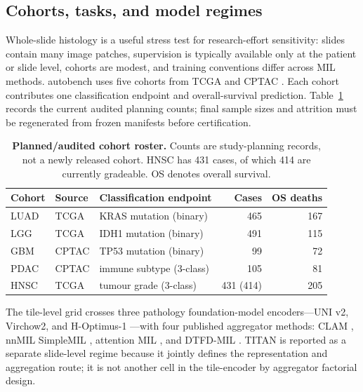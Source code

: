 \documentclass{article}
\newcommand{\autobench}{\textsf{autobench}\xspace}
\begin{document}
\subsection{Cohorts, tasks, and model regimes}

Whole-slide histology is a useful stress test for research-effort sensitivity:
slides contain many image patches, supervision is typically available only at
the patient or slide level, cohorts are modest, and training conventions differ
across MIL methods.  \autobench uses five cohorts from TCGA and CPTAC
\cite{tcga2013pancancer,wang2021gbm,cao2021pdac}.  Each cohort contributes one
classification endpoint and overall-survival prediction.  Table~\ref{tab:data}
records the current audited planning counts; final sample sizes and attrition
must be regenerated from frozen manifests before certification.

\begin{table}[t]
\centering
\caption{\textbf{Planned/audited cohort roster.}  Counts are study-planning
records, not a newly released cohort. HNSC has 431 cases, of which 414 are
currently gradeable. OS denotes overall survival.}
\label{tab:data}
\small
\setlength{\tabcolsep}{4.5pt}
\begin{tabularx}{\linewidth}{llXrr}
\toprule
Cohort & Source & Classification endpoint & Cases & OS deaths \\
\midrule
LUAD & TCGA & KRAS mutation (binary) & 465 & 167 \\
LGG & TCGA & IDH1 mutation (binary) & 491 & 115 \\
GBM & CPTAC & TP53 mutation (binary) & 99 & 72 \\
PDAC & CPTAC & immune subtype (3-class) & 105 & 81 \\
HNSC & TCGA & tumour grade (3-class) & 431 (414) & 205 \\
\bottomrule
\end{tabularx}
\end{table}

The tile-level grid crosses three pathology foundation-model encoders---UNI
v2, Virchow2, and H-Optimus-1
\cite{xu2024uni,vorontsov2024virchow,saillard2024hoptimus}---with four
published aggregator methods: CLAM \cite{lu2021clam}, nnMIL SimpleMIL
\cite{luo2025nnmil}, attention MIL \cite{ilse2018attention}, and DTFD-MIL
\cite{zhang2022dtfd}.  TITAN \cite{ding2024titan} is reported as a separate
slide-level regime because it jointly defines the representation and
aggregation route; it is not another cell in the tile-encoder by aggregator
factorial design.
\end{document}
